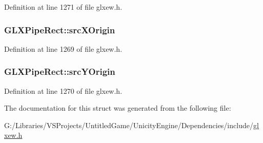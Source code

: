 Definition at line 1271 of file glxew.\+h.

\hypertarget{struct_g_l_x_pipe_rect_a9df2313c01f75d149e64f2ff467bc266}{}
\subsubsection[{src\+X\+Origin}]{ G\+L\+X\+Pipe\+Rect\+::src\+X\+Origin}\label{struct_g_l_x_pipe_rect_a9df2313c01f75d149e64f2ff467bc266}


Definition at line 1269 of file glxew.\+h.

\hypertarget{struct_g_l_x_pipe_rect_a1f7316dff7050ab2ce9d3d37f8c5450e}{}
\subsubsection[{src\+Y\+Origin}]{ G\+L\+X\+Pipe\+Rect\+::src\+Y\+Origin}\label{struct_g_l_x_pipe_rect_a1f7316dff7050ab2ce9d3d37f8c5450e}


Definition at line 1270 of file glxew.\+h.



The documentation for this struct was generated from the following file\+:\begin{DoxyCompactItemize}
\item 
G\+:/\+Libraries/\+V\+S\+Projects/\+Untitled\+Game/\+Unicity\+Engine/\+Dependencies/include/\hyperlink{glxew_8h}{glxew.\+h}\end{DoxyCompactItemize}
